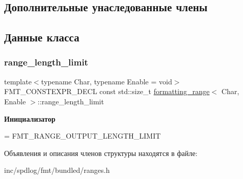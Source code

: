 \subsection*{Дополнительные унаследованные члены}


\subsection{Данные класса}
\mbox{\label{structformatting__range_ab04cc7d9dcb2abd142011edd971129d1}} 
\subsubsection{\texorpdfstring{range\+\_\+length\+\_\+limit}{range\_length\_limit}}
{\footnotesize\ttfamily template$<$typename Char, typename Enable = void$>$ \\
F\+M\+T\+\_\+\+C\+O\+N\+S\+T\+E\+X\+P\+R\+\_\+\+D\+E\+CL const std\+::size\+\_\+t \hyperlink{structformatting__range}{formatting\+\_\+range}$<$ Char, Enable $>$\+::range\+\_\+length\+\_\+limit\hspace{0.3cm}{\ttfamily [static]}}

{\bfseries Инициализатор}
\begin{DoxyCode}
=
      FMT\_RANGE\_OUTPUT\_LENGTH\_LIMIT
\end{DoxyCode}


Объявления и описания членов структуры находятся в файле\+:\begin{DoxyCompactItemize}
\item 
inc/spdlog/fmt/bundled/ranges.\+h\end{DoxyCompactItemize}
